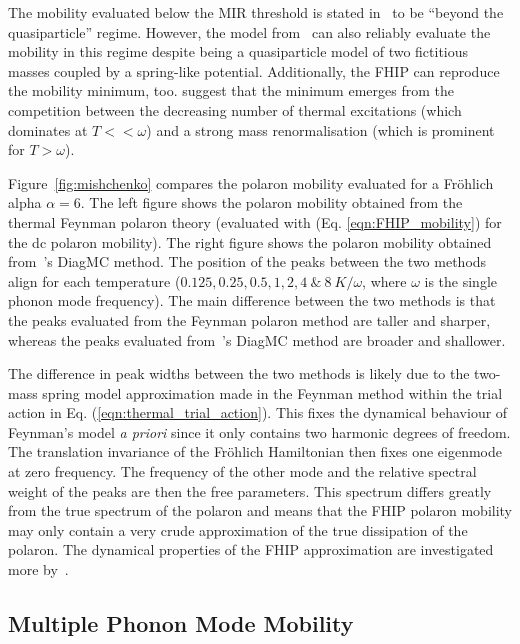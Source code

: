 The mobility evaluated below the MIR threshold is stated in~\cite{mishchenko_polaron_2019} to be ``beyond the quasiparticle'' regime. However, the model from~\cite{feynman_mobility_1962} can also reliably evaluate the mobility in this regime despite being a quasiparticle model of two fictitious masses coupled by a spring-like potential. Additionally, the FHIP can reproduce the mobility minimum, too. \cite{mishchenko_polaron_2019} suggest that the minimum emerges from the competition between the decreasing number of thermal excitations (which dominates at $T << \omega$) and a strong mass renormalisation (which is prominent for $T > \omega$). 

Figure~\ref{fig:mishchenko} compares the polaron mobility evaluated for a Fr\"ohlich alpha $\alpha = 6$. The left figure shows the polaron mobility obtained from the thermal Feynman polaron theory (evaluated with (Eq. \ref{eqn:FHIP_mobility}) for the dc polaron mobility). The right figure shows the polaron mobility obtained from~\cite{mishchenko_polaron_2019}'s DiagMC method. The position of the peaks between the two methods align for each temperature ($0.125, 0.25, 0.5, 1, 2, 4\  \&\ 8\ K/\omega$, where $\omega$ is the single phonon mode frequency). The main difference between the two methods is that the peaks evaluated from the Feynman polaron method are taller and sharper, whereas the peaks evaluated from~\cite{mishchenko_polaron_2019}'s DiagMC method are broader and shallower. 

The difference in peak widths between the two methods is likely due to the two-mass spring model approximation made in the Feynman method within the trial action in Eq. (\ref{eqn:thermal_trial_action}). This fixes the dynamical behaviour of Feynman's model \emph{a priori} since it only contains two harmonic degrees of freedom. The translation invariance of the Fr\"ohlich Hamiltonian then fixes one eigenmode at zero frequency. The frequency of the other mode and the relative spectral weight of the peaks are then the free parameters. This spectrum differs greatly from the true spectrum of the polaron and means that the FHIP polaron mobility may only contain a very crude approximation of the true dissipation of the polaron. The dynamical properties of the FHIP approximation are investigated more by~\cite{sels_dynamic_2016}.

\subsection{Multiple Phonon Mode Mobility}
\label{subsec:3-1-3}

